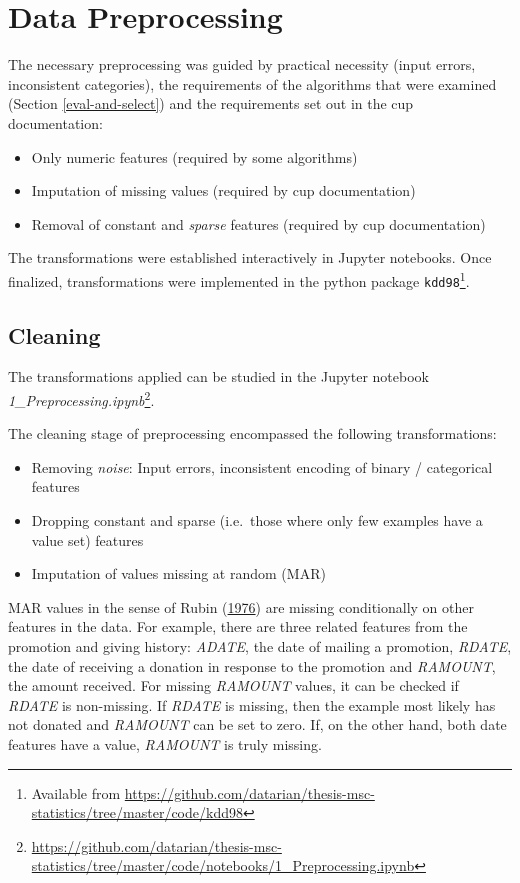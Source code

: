 \documentclass[
  11pt,
  a4paper,
  DIV=12,captions=tableheading,oneside,titlepage]{scrbook}
\providecommand{\tightlist}{%
  \setlength{\itemsep}{0pt}\setlength{\parskip}{0pt}}
\begin{document}
\hypertarget{data-preprocessing}{%
\section{Data Preprocessing}\label{data-preprocessing}}

The necessary preprocessing was guided by practical necessity (input errors, inconsistent categories), the requirements of the algorithms that were examined (Section \ref{eval-and-select}) and the requirements set out in the cup documentation:

\begin{itemize}
\tightlist
\item
  Only numeric features (required by some algorithms)
\item
  Imputation of missing values (required by cup documentation)
\item
  Removal of constant and \emph{sparse} features (required by cup documentation)
\end{itemize}

The transformations were established interactively in Jupyter notebooks. Once finalized, transformations were implemented in the python package \texttt{kdd98}\footnote{Available from \url{https://github.com/datarian/thesis-msc-statistics/tree/master/code/kdd98}}.

\hypertarget{cleaning}{%
\subsection{Cleaning}\label{cleaning}}

The transformations applied can be studied in the Jupyter notebook \emph{1\_Preprocessing.ipynb}\footnote{\url{https://github.com/datarian/thesis-msc-statistics/tree/master/code/notebooks/1_Preprocessing.ipynb}}.

The cleaning stage of preprocessing encompassed the following transformations:

\begin{itemize}
\tightlist
\item
  Removing \emph{noise}: Input errors, inconsistent encoding of binary / categorical features
\item
  Dropping constant and sparse (i.e.~those where only few examples have a value set) features
\item
  Imputation of values missing at random (MAR)
\end{itemize}

MAR values in the sense of Rubin (\protect\hyperlink{ref-rubin1976inference}{1976}) are missing conditionally on other features in the data. For example, there are three related features from the promotion and giving history: \emph{ADATE}, the date of mailing a promotion, \emph{RDATE}, the date of receiving a donation in response to the promotion and \emph{RAMOUNT}, the amount received. For missing \emph{RAMOUNT} values, it can be checked if \emph{RDATE} is non-missing. If \emph{RDATE} is missing, then the example most likely has not donated and \emph{RAMOUNT} can be set to zero. If, on the other hand, both date features have a value, \emph{RAMOUNT} is truly missing.
\end{document}

